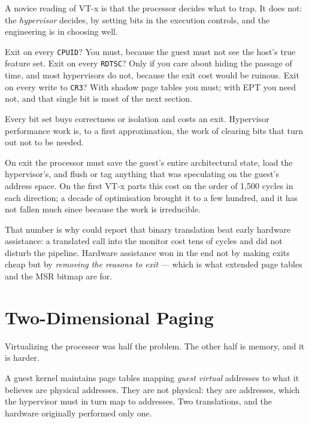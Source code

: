 \begin{conceptbox}
A novice reading of VT-x is that the processor decides what to trap. It does
not: the \emph{hypervisor} decides, by setting bits in the execution controls,
and the engineering is in choosing well.

\smallskip
Exit on every \texttt{CPUID}? You must, because the guest must not see the
host's true feature set. Exit on every \texttt{RDTSC}? Only if you care about
hiding the passage of time, and most hypervisors do not, because the exit cost
would be ruinous. Exit on every write to \texttt{CR3}? With shadow page tables
you must; with EPT you need not, and that single bit is most of the next
section.

\smallskip
Every bit set buys correctness or isolation and costs an exit. Hypervisor
performance work is, to a first approximation, the work of clearing bits that
turn out not to be needed.
\end{conceptbox}

\begin{alertbox}
On exit the processor must save the guest's entire architectural state, load
the hypervisor's, and flush or tag anything that was speculating on the guest's
address space. On the first VT-x parts this cost on the order of 1{,}500 cycles
in each direction; a decade of optimisation brought it to a few hundred, and it
has not fallen much since because the work is irreducible.

\smallskip
That number is why  could report that binary translation
beat early hardware assistance: a translated call into the monitor cost tens of
cycles and did not disturb the pipeline. Hardware assistance won in the end not
by making exits cheap but by \emph{removing the reasons to exit} --- which is
what extended page tables and the MSR bitmap are for.
\end{alertbox}

\section{Two-Dimensional Paging}

Virtualizing the processor was half the problem. The other half is memory, and
it is harder.

A guest kernel maintains page tables mapping \emph{guest virtual} addresses to
what it believes are physical addresses. They are not physical: they are
 addresses, which the hypervisor must in turn map to
 addresses. Two translations, and the hardware originally
performed only one.

